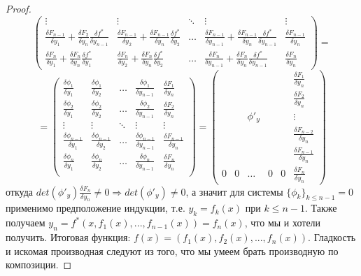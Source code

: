 \documentclass{article}
\theoremstyle{indented}
\theoremstyle{definition}
\theoremstyle{remark}
\newcommand{\df}[2]{\frac{\delta #1}{\delta #2}}
\begin{document}
\begin{proof}
$$\begin{pmatrix}
        \vdots                                      & \vdots                                      &\ddots & \vdots                                              & \vdots      \\
        \df{F_{n-1}}{y_1} + \df{F_2}{y_n} \df{f^*}{y_{n-1}}& \df{F_{n-1}}{y_2} + \df{F_{n-1}}{y_n} \df{f^*}{y_2} &\ldots & \df{F_{n-1}}{y_{n-1}}  + \df{F_{n-1}}{y_n} \df{f^*}{y_{n-1}} & \df{F_{n-1}}{y_n}\\
        \df{F_n}{y_1} + \df{F_n}{y_n} \df{f^*}{y_1} & \df{F_n}{y_2} + \df{F_n}{y_n} \df{f^*}{y_2} &\ldots & \df{F_n}{y_{n-1}} + \df{F_n}{y_n} \df{f^*}{y_{n-1}} & \df{F_n}{y_n}
    \end{pmatrix}  = 
    $$
    $$
    =
    \begin{pmatrix}
        \df{\phi_1}{y_1} & \df{\phi_1}{y_2} &\ldots & \df{\phi_1}{y_{n-1}} & \df{F_1}{y_n}\\
        \df{\phi_2}{y_1} & \df{\phi_2}{y_2} &\ldots & \df{\phi_2}{y_{n-1}} & \df{F_2}{y_n}\\
        \vdots           & \vdots           &\ddots & \vdots               &  \vdots \\
        \df{\phi_{n-1}}{y_1} & \df{\phi_{n-1}}{y_2} &\ldots & \df{\phi_{n-1}}{y_{n-1}} & \df{F_{n-1}}{y_n}\\
        \df{\phi_n}{y_1} & \df{\phi_n}{y_2} &\ldots & \df{\phi_n}{y_{n-1}} & \df{F_n}{y_n}\\
    \end{pmatrix} 
    =
    \begin{pmatrix}
          &   &        &   &   & \df{F_1}{y_n}    \\
          &   &        &   &   & \df{F_2}{y_n}    \\
          &   &\phi'_y &   &   & \vdots           \\
          &   &        &   &   & \df{F_{n-2}}{y_n}\\
          &   &        &   &   & \df{F_{n-1}}{y_n}\\
        0 & 0 & \ldots & 0 & 0 & \df{F_n}{y_n}
    \end{pmatrix} 
    $$
    откуда $det(\phi'_y) \df{F_n}{y_n} \not= 0 \Rightarrow det(\phi'_y) \not= 0$, а значит для системы $\{\phi_k\}_{k\leq n-1}=0$ применимо предположение индукции, т.е. $y_k = f_k(x)$ при $k \leq n-1$.
    Также получаем $y_n=f^*(x, f_1(x), ... , f_{n-1}(x))=f_n(x)$, что мы и хотели получить. Итоговая функция: $f(x)=(f_1(x), f_2(x), ... , f_n(x))$. Гладкость и искомая производная следуют из того, что мы умеем брать
    производную по композиции.  
\end{proof}
\end{document}
